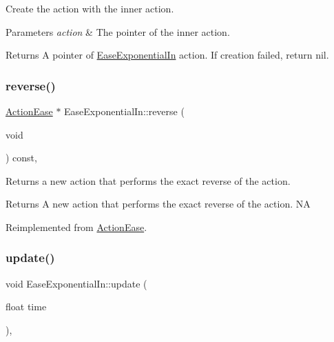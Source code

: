 Create the action with the inner action. 


\begin{DoxyParams}{Parameters}
{\em action} & The pointer of the inner action. \\
\hline
\end{DoxyParams}
\begin{DoxyReturn}{Returns}
A pointer of \hyperlink{classEaseExponentialIn}{Ease\+Exponential\+In} action. If creation failed, return nil. 
\end{DoxyReturn}
\mbox{\label{classEaseExponentialIn_aed789ba9f06994ce25edbba5d6de5178}} 
\subsubsection{\texorpdfstring{reverse()}{reverse()}}
{\footnotesize\ttfamily \hyperlink{classActionEase}{Action\+Ease} $\ast$ Ease\+Exponential\+In\+::reverse (\begin{DoxyParamCaption}\item[{void}]{ }\end{DoxyParamCaption}) const\hspace{0.3cm}{\ttfamily [override]}, {\ttfamily [virtual]}}

Returns a new action that performs the exact reverse of the action.

\begin{DoxyReturn}{Returns}
A new action that performs the exact reverse of the action.  NA 
\end{DoxyReturn}


Reimplemented from \hyperlink{classActionEase_ab99eb083fa033fae1d6c948fdc730782}{Action\+Ease}.

\mbox{\label{classEaseExponentialIn_abc674dd0975bb25dd079583546516602}} 
\subsubsection{\texorpdfstring{update()}{update()}}
{\footnotesize\ttfamily void Ease\+Exponential\+In\+::update (\begin{DoxyParamCaption}\item[{float}]{time }\end{DoxyParamCaption})\hspace{0.3cm}{\ttfamily [override]}, {\ttfamily [virtual]}}

